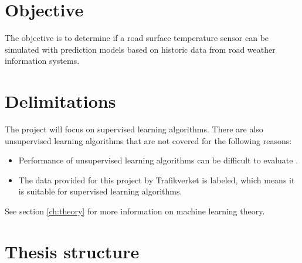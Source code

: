 

\section{Objective}
	The objective is to determine if a road surface temperature sensor can be simulated with prediction models based on historic data from road weather information systems.
\section{Delimitations} \label{sec:delimitations}
	The project will focus on supervised learning algorithms. There are also unsupervised learning algorithms that are not covered for the following reasons:
\begin{itemize}
	\item Performance of unsupervised learning algorithms can be difficult to evaluate \cite{BOOK:3}.
	\item The data provided for this project by Trafikverket is labeled, which means it is suitable for supervised learning algorithms.
\end{itemize}
See section \ref{ch:theory} for more information on machine learning theory.
\section{Thesis structure}
